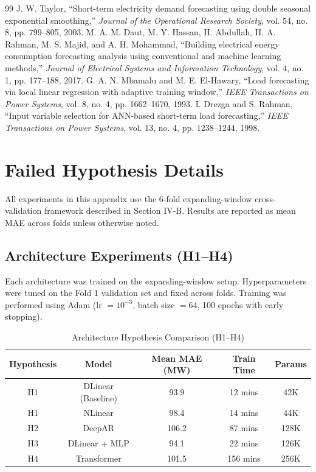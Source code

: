 \documentclass[journal]{IEEEtran}
\begin{document}
\begin{table}[t]
\begin{thebibliography}{99}
 J. W. Taylor, ``Short-term electricity demand forecasting using double seasonal exponential smoothing,'' \textit{Journal of the Operational Research Society}, vol. 54, no. 8, pp. 799--805, 2003.
 M. A. M. Daut, M. Y. Hassan, H. Abdullah, H. A. Rahman, M. S. Majid, and A. H. Mohammad, ``Building electrical energy consumption forecasting analysis using conventional and machine learning methods,'' \textit{Journal of Electrical Systems and Information Technology}, vol. 4, no. 1, pp. 177--188, 2017.
 G. A. N. Mbamalu and M. E. El-Hawary, ``Load forecasting via local linear regression with adaptive training window,'' \textit{IEEE Transactions on Power Systems}, vol. 8, no. 4, pp. 1662--1670, 1993.
 I. Drezga and S. Rahman, ``Input variable selection for ANN-based short-term load forecasting,'' \textit{IEEE Transactions on Power Systems}, vol. 13, no. 4, pp. 1238--1244, 1998.
\end{thebibliography}

\appendices

\section{Failed Hypothesis Details}

All experiments in this appendix use the 6-fold expanding-window cross-validation framework described in Section IV-B. Results are reported as mean MAE across folds unless otherwise noted.

\subsection{Architecture Experiments (H1--H4)}
Each architecture was trained on the expanding-window setup. Hyperparameters were tuned on the Fold 1 validation set and fixed across folds. Training was performed using Adam (lr $= 10^{-3}$, batch size $= 64$, 100 epochs with early stopping).

\begin{table}[htbp]
\caption{Architecture Hypothesis Comparison (H1--H4)}
\label{tab:arch_failures}
\centering
\begin{tabular}{ccccc}
\toprule
\textbf{Hypothesis} & \textbf{Model} & \textbf{Mean MAE (MW)} & \textbf{Train Time} & \textbf{Params} \\
\midrule
H1 & DLinear (Baseline) & 93.9 & 12 mins & 42K \\
H1 & NLinear & 98.4 & 14 mins & 44K \\
H2 & DeepAR & 106.2 & 87 mins & 128K \\
H3 & DLinear + MLP & 94.1 & 22 mins & 126K \\
H4 & Transformer & 101.5 & 156 mins & 256K \\
\bottomrule
\end{tabular}
\end{table}


\end{table}
\end{document}
